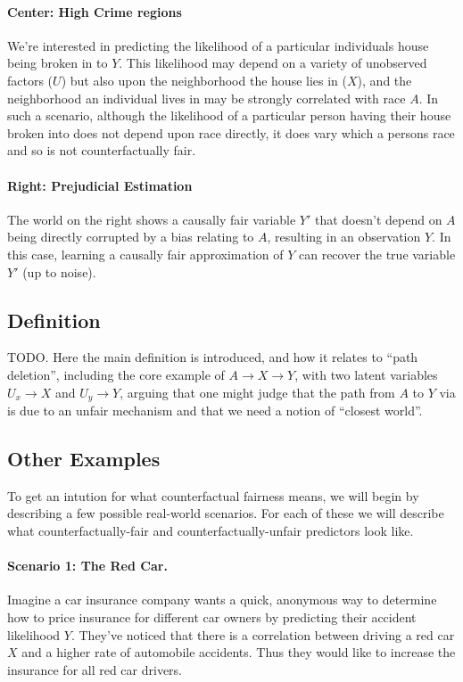 \paragraph{Center: High Crime regions} We're interested in predicting
the likelihood of a particular individuals house being broken in to
$Y$. This likelihood may depend on a variety of unobserved factors
($U$) but also upon the neighborhood the house lies in ($X$), and the
neighborhood an individual lives in may be strongly correlated with
race $A$. In such a scenario, although the likelihood of a particular
person having their house broken into does not depend upon race
directly, it does vary which a persons race and so is not
counterfactually fair.

\paragraph{Right: Prejudicial Estimation} The world on the right shows a
causally fair variable $Y'$ that doesn't depend on $A$ being directly
corrupted by a bias relating to $A$, resulting in an observation
$Y$. In this case, learning a causally fair approximation of $Y$ can
recover the true variable $Y'$ (up to noise).

\subsection{Definition}
TODO. Here the main definition is introduced, and how it relates to ``path deletion'',
including the core example of $A \rightarrow X \rightarrow Y$, with two latent
variables $U_x \rightarrow X$ and $U_y \rightarrow Y$, arguing that one might judge
that the path from $A$ to $Y$ via is due to an unfair mechanism and that we need a
notion of ``closest world''.

\subsection{Other Examples}
To get an intution for what counterfactual fairness means, we will begin by describing a few possible real-world scenarios. For each of these we will describe what counterfactually-fair and counterfactually-unfair predictors look like.

\paragraph{Scenario 1: The Red Car.}
Imagine a car insurance company wants a quick, anonymous way to determine how to price insurance for different car owners by predicting their accident likelihood $Y$. They've noticed that there is a correlation between driving a red car $X$ and a higher rate of automobile accidents. Thus they would like to increase the insurance for all red car drivers. 

